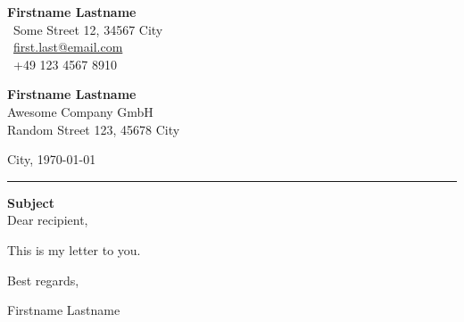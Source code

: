 \documentclass[a4paper,12pt]{article}
\begin{document}
\begin{flushright}
    \textbf{Firstname Lastname} \\
    \color{gray}
    ~Some Street 12, 34567 City \\
    ~\href{mailto:first.last@email.com}{first.last@email.com} \\
    ~+49 123 4567 8910
\end{flushright}

\begin{flushleft}
    \textbf{Firstname Lastname} \\
    \color{gray}
    Awesome Company GmbH \\
    Random Street 123, 45678 City
\end{flushleft}

\hfill City, \today \\[-1.5ex]
\rule{\textwidth}{0.8pt}
\textbf{Subject} \\[2ex]

Dear recipient,
\par
This is my letter to you.
\par
Best regards,
\par
Firstname Lastname



\end{document}
